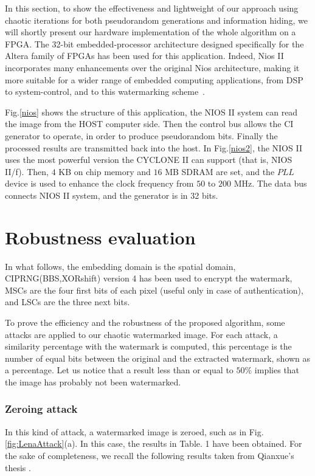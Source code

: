 In this section, to show the effectiveness and lightweight of our approach using
chaotic iterations for both pseudorandom generations and information hiding,
we will shortly present our hardware implementation of the whole algorithm on a FPGA.
The 32-bit embedded-processor architecture designed specifically for the Altera family of FPGAs 
has been used for this application. Indeed, Nios II incorporates many enhancements over the original 
Nios architecture, making it more suitable for a wider range of embedded computing applications, 
from DSP to system-control, and to this watermarking scheme~\cite{nios}. 

Fig.\ref{nios} shows the structure of this application, 
the NIOS II system can read the image from the HOST computer side. 
Then the control bus allows
the CI generator to operate, in order to produce pseudorandom bits. 
Finally the processed results are transmitted back into 
the host. In Fig.\ref{nios2}, the NIOS II uses the most powerful 
version the CYCLONE II can support (that is, NIOS II/f). 
Then, $4$ KB on chip memory and $16$ MB SDRAM are set, and 
the $PLL$ device is used to enhance the clock frequency from $50$ 
to $200$ MHz. The data bus connects NIOS II system, and the generator is in 32 bits.


\section{Robustness evaluation}
\label{robust}
In what follows, the embedding domain is the spatial domain, CIPRNG(BBS,XORshift) version 4 
 has been used to encrypt the watermark, MSCs are the four first bits of each pixel (useful only in case of authentication), and LSCs are the three next bits.

To prove the efficiency and the robustness of the proposed algorithm, some
attacks are applied to our chaotic watermarked image. For each attack, a
similarity percentage with the watermark is computed, this percentage is the
number of equal bits between the original and the extracted watermark, shown
as a percentage. Let us notice that a result less than or equal to $50\%$
implies that the image has probably not been watermarked.

\subsubsection{Zeroing attack}

In this kind of attack, a watermarked image is zeroed, such as in Fig.\ref{fig:LenaAttack}(a). In this case, the results in Table. 1 have been obtained.
 For the sake of completeness, we 
recall the following results taken from Qianxue's thesis \cite{bibtexwangqianxue}.



